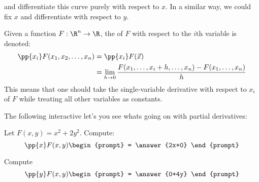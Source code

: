 \documentclass{ximera}
\begin{document}
\begin{image}
\end{image}
and differentiate this curve purely with respect to $x$. In a similar way, we could fix $x$ and differentiate with respect to $y$.

\begin{definition}
  Given a function $F:\R^n\to\R$, the  of $F$
  with respect to the $i$th variable is denoted:
  \begin{align*}
  \pp{x_i} F(x_1,x_2,\dots,x_n) &= \pp{x_i} F(\vec{x})\\
  &= \lim_{h\to 0} \frac{F(x_1,\dots,x_i+h,\dots,x_n) - F(x_1,\dots,x_n)}{h}
  \end{align*}
  This means that one should take the single-variable derivative with
  respect to $x_i$ of $F$ while treating all other variables as
  constants.
\end{definition}

\begin{onlineOnly}
  The following interactive let's you see whats going on with partial derivatives:
  \begin{center}
  \end{center}
\end{onlineOnly}


\begin{question}
  Let $F(x,y) = x^2+2y^2$. Compute:
  \[
  \pp{x} F(x,y)
  \begin{prompt}
    = \answer{2x+0}
  \end{prompt}
  \]
  \begin{question}
    Compute
  \[
  \pp{y} F(x,y)
  \begin{prompt}
    = \answer{0+4y}
  \end{prompt}
  \]
  \end{question}
\end{question}
\end{document}

